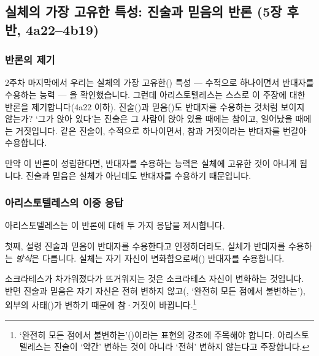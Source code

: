 \documentclass[12pt, a4paper]{article}
\begin{document}
\thispagestyle{firstpage}


\subsection{실체의 가장 고유한 특성: 진술과 믿음의 반론 (5장 후반, 4a22--4b19)}

\subsubsection{반론의 제기}

2주차 마지막에서 우리는 실체의 가장 고유한() 특성 --- 수적으로 하나이면서 반대자를 수용하는 능력 --- 을 확인했습니다. 그런데 아리스토텔레스는 스스로 이 주장에 대한 반론을 제기합니다(4a22 이하). 진술()과 믿음()도 반대자를 수용하는 것처럼 보이지 않는가? `그가 앉아 있다'는 진술은 그 사람이 앉아 있을 때에는 참이고, 일어났을 때에는 거짓입니다. 같은 진술이, 수적으로 하나이면서, 참과 거짓이라는 반대자를 번갈아 수용합니다.

만약 이 반론이 성립한다면, 반대자를 수용하는 능력은 실체에 고유한 것이 아니게 됩니다. 진술과 믿음은 실체가 아닌데도 반대자를 수용하기 때문입니다.

\subsubsection{아리스토텔레스의 이중 응답}

아리스토텔레스는 이 반론에 대해 두 가지 응답을 제시합니다.

첫째, 설령 진술과 믿음이 반대자를 수용한다고 인정하더라도, 실체가 반대자를 수용하는 \emph{방식}은 다릅니다. 실체는 자기 자신이 변화함으로써() 반대자를 수용합니다.


소크라테스가 차가워졌다가 뜨거워지는 것은 소크라테스 자신이 변화하는 것입니다. 반면 진술과 믿음은 자기 자신은 전혀 변하지 않고(, `완전히 모든 점에서 불변하는'), 외부의 사태()가 변하기 때문에 참·거짓이 바뀝니다.\footnote{`완전히 모든 점에서 불변하는'()이라는 표현의 강조에 주목해야 합니다. 아리스토텔레스는 진술이 `약간' 변하는 것이 아니라 `전혀' 변하지 않는다고 주장합니다.}
\end{document}
